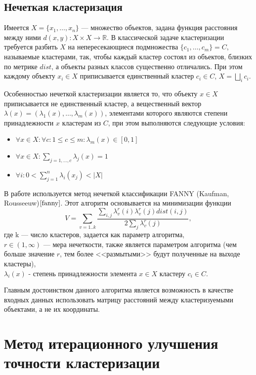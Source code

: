 \documentclass[a4paper, 12pt]{article} %
\begin{document}
\subsection{Нечеткая кластеризация}
Имеется $X=\{x_{1},\dots,x_{n}\}$ --- множество объектов, задана функция расстояния между ними $d(x, y): X\times X  \to \mathbb{R}$. В классической задаче кластеризации требуется разбить $X$ на непересекающиеся подмножества $\{c_{1},\dots,c_{m}\} = C$,  называемые кластерами, так, чтобы каждый кластер состоял из объектов, близких по метрике $dist$, а объекты разных классов существенно отличались. При этом каждому объекту $x_{i} \in X$ приписывается единственный кластер $c_{i} \in C$, $X = \bigsqcup_{i} c_{i}$.
\par
 Особенностью нечеткой кластеризации является то, что объекту $x \in X$ приписывается не единственный кластер, а вещественный вектор $\lambda(x)=(\lambda_{1}(x),\dots,\lambda_{m}(x))$, элементами которого являются степени принадлежности $x$ кластерам из $C$, при этом выполняются следующие условия:
 \begin{itemize}
 \item $\forall x \in X: \forall c: 1\leq c \leq m:  \lambda_{m}(x) \in [0,1]$
 \item $\forall x \in X: \sum_{j=1,\dots,c} \lambda_{j}(x) = 1$
 \item $\forall i : 0 < \sum_{j=1}^{n} \lambda_{i}(x_{j}) < |X|  $
 \end{itemize} 
 \par
 В работе используется метод нечеткой классификации FANNY (Kaufman, Rousseeuw)$\cite{fanny}$. Этот алгоритм основывается на минимизации функции 
\[
	V=\sum_{v=1..k} \frac{\sum_{i,j} \lambda_{v}^r(i) \lambda_{v}^r(j) dist(i,j)}{2 \sum_{j} \lambda_{v}^r(j)},
\]
где k --- число кластеров, задается как параметр алгоритма,\\
$r \in (1, \infty)$ --- мера нечеткости, также является параметром алгоритма (чем больше значение $r$, тем более <<размытыми>> будут полученные на выходе кластеры),\\ $\lambda_{i}(x)$ - степень принадлежности элемента $x \in X$ кластеру $c_{i} \in C$. 
 \par
 Главным достоинством данного алгоритма является возможность в качестве входных данных использовать матрицу расстояний между кластеризуемыми объектами, а не их координаты. 

\section{Метод итерационного улучшения точности кластеризации}
\end{document}
